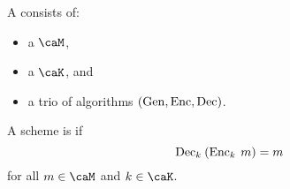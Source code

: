 \documentclass[a5paper]{article}
\begin{document}
\begin{definition}
  A  consists of:
  \begin{itemize}
    \itemsep0em
    \item a  $\caM$,
    \item a  $\caK$, and
    \item a trio of algorithms $(\operatorname{Gen},\operatorname{Enc},\operatorname{Dec})$.
  \end{itemize}
  A scheme is  if
  \begin{equation*}
    \operatorname{Dec}_k\hspace{0.23em} (\operatorname{Enc}_k\hspace{0.23em} m)=m
  \end{equation*}
  for all $m\in\caM$ and $k\in\caK$.
\end{definition}
\end{document}
